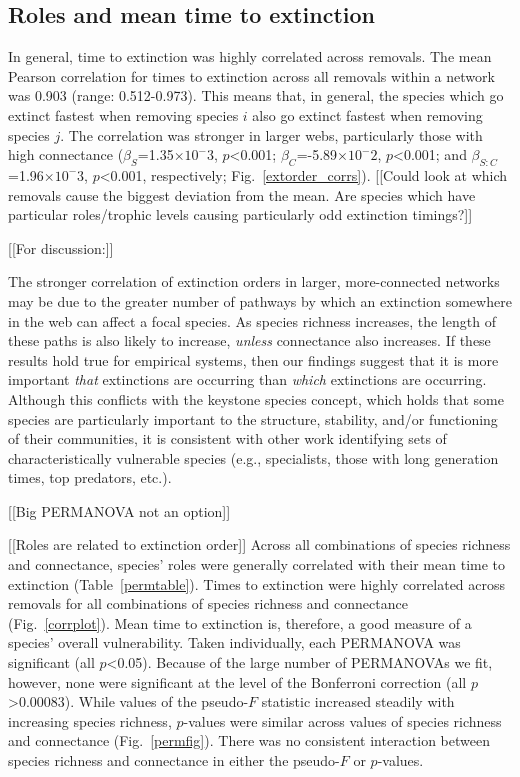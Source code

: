\documentclass[12pt]{article}
\begin{document}
	\subsection*{Roles and mean time to extinction}

		In general, time to extinction was highly correlated across removals. The mean Pearson correlation for times to extinction across all removals within a network was 0.903 (range: 0.512-0.973). This means that, in general, the species which go extinct fastest when removing species $i$ also go extinct fastest when removing species $j$. The correlation was stronger in larger webs, particularly those with high connectance ($\beta_{S}$=1.35$\times10^-3$, $p$\textless0.001; $\beta_{C}$=-5.89$\times10^-2$, $p$\textless0.001; and $\beta_{S:C}$=1.96$\times10^-3$, $p$\textless0.001, respectively; Fig.~\ref{extorder_corrs}). 
		[[Could look at which removals cause the biggest deviation from the mean. Are species which have particular roles/trophic levels causing particularly odd extinction timings?]]

		[[For discussion:]]

		The stronger correlation of extinction orders in larger, more-connected networks may be due to the greater number of pathways by which an extinction somewhere in the web can affect a focal species. As species richness increases, the length of these paths is also likely to increase, \emph{unless} connectance also increases. If these results hold true for empirical systems, then our findings suggest that it is more important \emph{that} extinctions are occurring than \emph{which} extinctions are occurring. Although this conflicts with the keystone species concept, which holds that some species are particularly important to the structure, stability, and/or functioning of their communities, it is consistent with other work identifying sets of characteristically vulnerable species (e.g., specialists, those with long generation times, top predators, etc.).



		[[Big PERMANOVA not an option]]


		[[Roles are related to extinction order]]
		Across all combinations of species richness and connectance, species' roles were generally correlated with their mean time to extinction (Table~\ref{permtable}). Times to extinction were highly correlated across removals for all combinations of species richness and connectance (Fig.~\ref{corrplot}). Mean time to extinction is, therefore, a good measure of a species' overall vulnerability. Taken individually, each PERMANOVA was significant (all $p$\textless0.05). Because of the large number of PERMANOVAs we fit, however, none were significant at the level of the Bonferroni correction (all $p$\textgreater0.00083). While values of the pseudo-$F$ statistic increased steadily with increasing species richness, $p$-values were similar across values of species richness and connectance (Fig.~\ref{permfig}). There was no consistent interaction between species richness and connectance in either the pseudo-$F$ or $p$-values.
\end{document}
